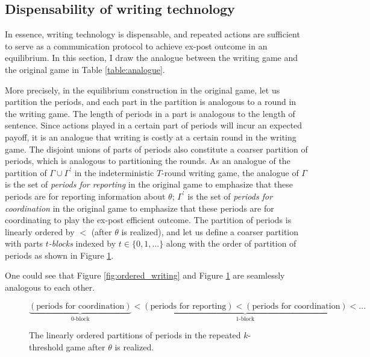 \documentclass[12pt,letter]{article}
\theoremstyle{definition}
\theoremstyle{remark}
\theoremstyle{claim}
\begin{document}
\subsection{Dispensability of writing technology}
\label{sec:dis_writing}
In essence, writing technology is dispensable, and repeated actions are sufficient to serve as a communication protocol to achieve ex-post outcome in an  equilibrium. In this section, I draw the analogue between the writing game and the original game in Table \ref{table:analogue}. 

More precisely, in the equilibrium construction in the original game, let us partition the periods, and each part in the partition is analogous to a round in the writing game. The length of periods in a part is analogous to the length of sentence. Since actions played in a certain part of periods will incur an expected payoff, it is an analogue that writing is costly at a certain round in the writing game. The disjoint unions of parts of periods also constitute a coarser partition of periods, which is analogous to partitioning the rounds. As an analogue of the partition of $\Gamma\cup\Gamma^{'}$ in the indeterministic $T$-round writing game, the analogue of $\Gamma$ is the set of \textit{periods for reporting} in the original game to emphasize that these periods are for reporting information about $\theta$; $\Gamma^{'}$ is the set of \textit{periods for coordination} in the original game to emphasize that these periods are for coordinating to play the ex-post efficient outcome. The partition of periods is linearly ordered by $<$ (after $\theta$ is realized), and let us define a coarser partition with parts \textit{$t$-blocks} indexed by $t\in\{0,1,...\}$ along with the order of partition of periods as shown in Figure \ref{fig:ordered_original_game}. 

One could see that Figure \ref{fig:ordered_writing} and Figure \ref{fig:ordered_original_game} are seamlessly analogous to each other.

\begin{figure}
\caption{The linearly ordered partitions of periods in the repeated $k$-threshold game after $\theta$ is realized.}
\label{fig:ordered_original_game}
\[\underbrace{(\text{periods for coordination})}_{\text{$0$-block}}<\underbrace{(\text{periods for reporting})<(\text{periods for coordination})}_{\text{$1$-block}}<...\]

\end{figure}
\end{document}
